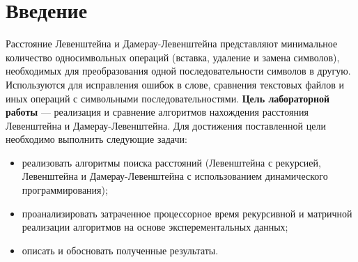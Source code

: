 \chapter*{Введение}
	Расстояние Левенштейна и Дамерау-Левенштейна представляют минимальное количество односимвольных операций (вставка, удаление и  замена символов), необходимых для преобразования одной последовательности символов в другую. Используются для исправления ошибок в слове, сравнения текстовых файлов и иных операций с символьными последовательностями.\newline
	\indent\textbf{Цель лабораторной работы} --- реализация и сравнение алгоритмов нахождения расстояния Левенштейна и Дамерау-Левенштейна. Для достижения поставленной цели необходимо выполнить следующие задачи:
\begin{itemize}
\item реализовать алгоритмы поиска расстояний (Левенштейна с рекурсией, Левенштейна и Дамерау-Левенштейна с использованием динамического программирования);
\item проанализировать затраченное процессорное время рекурсивной и матричной реализации алгоритмов на основе эксперементальных данных;
\item описать и обосновать полученные результаты.
\end{itemize}